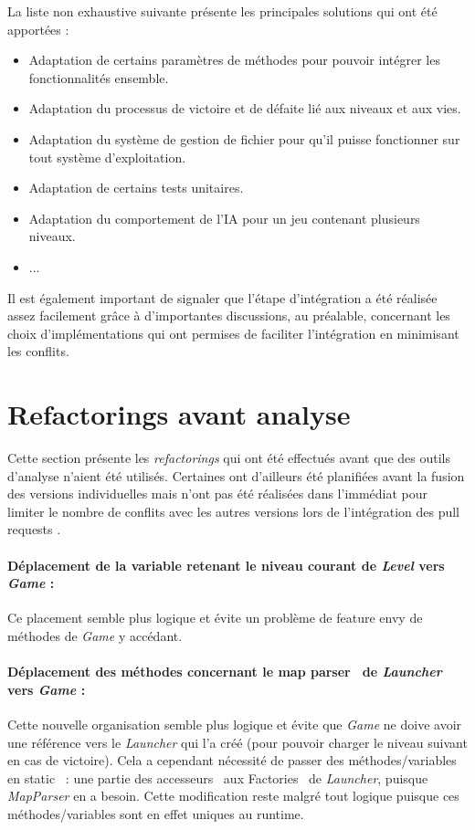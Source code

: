 \documentclass[12pt, openany]{report}
\begin{document}
La liste non exhaustive suivante présente les principales solutions qui ont été apportées :\\
\begin{itemize}
\item Adaptation de certains paramètres de méthodes pour pouvoir intégrer les fonctionnalités ensemble.
\item Adaptation du processus de victoire et de défaite lié aux niveaux et aux vies.
\item Adaptation du système de gestion de fichier pour qu'il puisse fonctionner sur tout système d'exploitation.
\item Adaptation de certains tests unitaires.
\item Adaptation du comportement de l'IA pour un jeu contenant plusieurs niveaux.
\item ...
\end{itemize}

Il est également important de signaler que l'étape d'intégration a été réalisée assez facilement grâce à d'importantes discussions, au préalable, concernant les choix d'implémentations qui ont permises de faciliter l'intégration en minimisant les conflits.


\section{Refactorings avant analyse}\label{refactorings}
Cette section présente les \textit{refactorings} qui ont été effectués avant que des outils d'analyse n'aient été utilisés. Certaines ont d'ailleurs été
planifiées avant la fusion des versions individuelles mais n'ont pas été réalisées dans l'immédiat pour limiter le nombre de conflits avec les autres versions lors de l'intégration des \og pull requests \fg .

\paragraph{Déplacement de la variable retenant le niveau courant de \textit{Level} vers \textit{Game} : }
Ce placement semble plus logique et évite un problème de \og feature envy \fg de méthodes de \mbox{\textit{Game}} y accédant.
\paragraph{Déplacement des méthodes concernant le \og map parser \fg \, de \textit{Launcher} vers \textit{Game} : }
Cette nouvelle organisation semble plus logique et évite que \mbox{\textit{Game}} ne doive avoir une référence vers le \mbox{\textit{Launcher}} qui l’a créé (pour pouvoir charger le niveau suivant en cas de victoire).
Cela a cependant nécessité de passer des méthodes/variables en \og static \fg \, : une partie des \og accesseurs \fg \, aux \og Factories \fg \, de \mbox{\textit{Launcher}}, puisque \mbox{\textit{MapParser}} en a besoin. Cette modification reste malgré tout logique puisque ces méthodes/variables sont en effet uniques au runtime.
\end{document}
